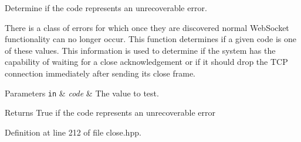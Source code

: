 Determine if the code represents an unrecoverable error. 

There is a class of errors for which once they are discovered normal Web\+Socket functionality can no longer occur. This function determines if a given code is one of these values. This information is used to determine if the system has the capability of waiting for a close acknowledgement or if it should drop the T\+CP connection immediately after sending its close frame.


\begin{DoxyParams}[1]{Parameters}
\mbox{\tt in}  & {\em code} & The value to test. \\
\hline
\end{DoxyParams}
\begin{DoxyReturn}{Returns}
True if the code represents an unrecoverable error 
\end{DoxyReturn}


Definition at line 212 of file close.\+hpp.


